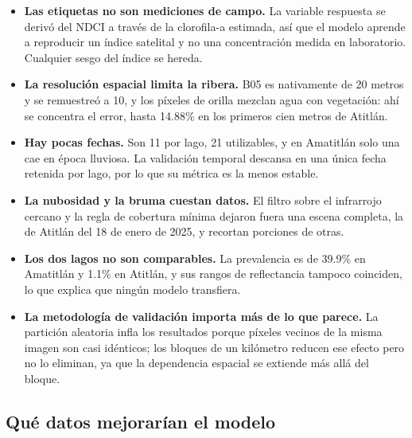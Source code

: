 \documentclass[10pt,a4paper]{article}
\begin{document}
\begin{itemize}
  \item \textbf{Las etiquetas no son mediciones de campo.} La variable respuesta se derivó del NDCI a través de la
  clorofila-a estimada, así que el modelo aprende a reproducir un índice satelital y no una concentración medida en
  laboratorio. Cualquier sesgo del índice se hereda.
  \item \textbf{La resolución espacial limita la ribera.} B05 es nativamente de 20 metros y se remuestreó a 10, y
  los píxeles de orilla mezclan agua con vegetación: ahí se concentra el error, hasta 14.88\% en los primeros cien
  metros de Atitlán.
  \item \textbf{Hay pocas fechas.} Son 11 por lago, 21 utilizables, y en Amatitlán solo una cae en época lluviosa.
  La validación temporal descansa en una única fecha retenida por lago, por lo que su métrica es la menos estable.
  \item \textbf{La nubosidad y la bruma cuestan datos.} El filtro sobre el infrarrojo cercano y la regla de
  cobertura mínima dejaron fuera una escena completa, la de Atitlán del 18 de enero de 2025, y recortan porciones
  de otras.
  \item \textbf{Los dos lagos no son comparables.} La prevalencia es de 39.9\% en Amatitlán y 1.1\% en Atitlán, y
  sus rangos de reflectancia tampoco coinciden, lo que explica que ningún modelo transfiera.
  \item \textbf{La metodología de validación importa más de lo que parece.} La partición aleatoria infla los
  resultados porque píxeles vecinos de la misma imagen son casi idénticos; los bloques de un kilómetro reducen ese
  efecto pero no lo eliminan, ya que la dependencia espacial se extiende más allá del bloque.
\end{itemize}

\subsection{Qué datos mejorarían el modelo}
\end{document}
